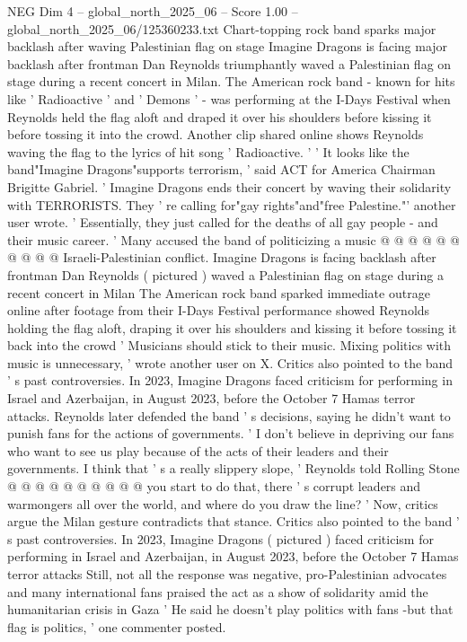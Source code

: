 \begin{textsample}{NEG Dim 4 – global\_north\_2025\_06 – Score 1.00 – global\_north\_2025\_06/125360233.txt}  \label{ex:f4_neg_063}
Chart-topping rock band sparks major backlash after waving Palestinian flag on stage Imagine Dragons is facing major backlash after frontman Dan Reynolds triumphantly waved a Palestinian flag on stage during a recent concert in Milan.
The American rock band - known for hits like ' Radioactive ' and ' Demons ' - was performing at the I-Days Festival when Reynolds held the flag aloft and draped it over his shoulders before kissing it before tossing it into the crowd.
Another clip shared online shows Reynolds waving the flag to the lyrics of hit song ' Radioactive. ' ' It looks like the band"Imagine Dragons"supports terrorism, ' said ACT for America Chairman Brigitte Gabriel. ' Imagine Dragons ends their concert by waving their solidarity with TERRORISTS.
They ' re calling for"gay rights"and"free Palestine."' another user wrote. ' Essentially, they just called for the deaths of all gay people - and their music career. ' Many accused the band of politicizing a music @ @ @ @ @ @ @ @ @ @ Israeli-Palestinian conflict.
Imagine Dragons is facing backlash after frontman Dan Reynolds ( pictured ) waved a Palestinian flag on stage during a recent concert in Milan The American rock band sparked immediate outrage online after footage from their I-Days Festival performance showed Reynolds holding the flag aloft, draping it over his shoulders and kissing it before tossing it back into the crowd ' Musicians should stick to their music.
Mixing politics with music is unnecessary, ' wrote another user on X.
Critics also pointed to the band ' s past controversies.
In 2023, Imagine Dragons faced criticism for performing in Israel and Azerbaijan, in August 2023, before the October 7 Hamas terror attacks.
Reynolds later defended the band ' s decisions, saying he didn't want to punish fans for the actions of governments. ' I don't believe in depriving our fans who want to see us play because of the acts of their leaders and their governments.
I think that ' s a really slippery slope, ' Reynolds told Rolling Stone @ @ @ @ @ @ @ @ @ @ you start to do that, there ' s corrupt leaders and warmongers all over the world, and where do you draw the line? ' Now, critics argue the Milan gesture contradicts that stance.
Critics also pointed to the band ' s past controversies.
In 2023, Imagine Dragons ( pictured ) faced criticism for performing in Israel and Azerbaijan, in August 2023, before the October 7 Hamas terror attacks Still, not all the response was negative, pro-Palestinian advocates and many international fans praised the act as a show of solidarity amid the humanitarian crisis in Gaza ' He said he doesn't play politics with fans -but that flag is politics, ' one commenter posted.

\end{textsample}
